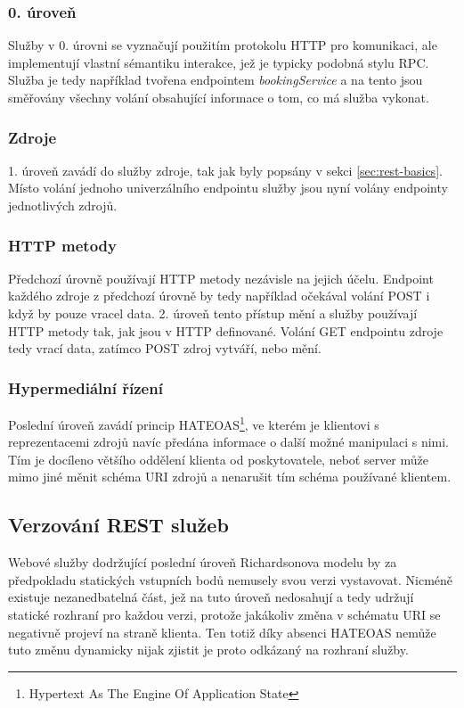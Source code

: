 \documentclass[czech,DP]{thesiskiv}
\begin{document}
\subsubsection{0. úroveň}
Služby v 0. úrovni se vyznačují použitím protokolu HTTP pro komunikaci, ale implementují vlastní sémantiku interakce, jež je typicky podobná stylu RPC. Služba je tedy například tvořena endpointem \textit{bookingService} a na tento jsou směřovány všechny volání obsahující informace o tom, co má služba vykonat. 

\subsubsection{Zdroje}
1. úroveň zavádí do služby zdroje, tak jak byly popsány v sekci \ref{sec:rest-basics}. Místo volání jednoho univerzálního endpointu služby jsou nyní volány endpointy jednotlivých zdrojů.

\subsubsection{HTTP metody}
Předchozí úrovně používají HTTP metody nezávisle na jejich účelu. Endpoint každého zdroje z předchozí úrovně by tedy například očekával volání POST i když by pouze vracel data. 2. úroveň tento přístup mění a služby používají HTTP metody tak, jak jsou v HTTP definované. Volání GET endpointu zdroje tedy vrací data, zatímco POST zdroj vytváří, nebo mění. 

\subsubsection{Hypermediální řízení}
Poslední úroveň zavádí princip HATEOAS\footnote{Hypertext As The Engine Of Application State}, ve kterém je klientovi s reprezentacemi zdrojů navíc předána informace o další možné manipulaci s nimi. Tím je docíleno většího oddělení klienta od poskytovatele, neboť server může mimo jiné měnit schéma URI zdrojů a nenarušit tím schéma používané klientem.

\subsection{Verzování REST služeb}

Webové služby dodržující poslední úroveň Richardsonova modelu by za předpokladu statických vstupních bodů nemusely svou verzi vystavovat. Nicméně existuje nezanedbatelná část, jež na tuto úroveň nedosahují a tedy udržují statické rozhraní pro každou verzi, protože jakákoliv změna v schématu URI se negativně projeví na straně klienta. Ten totiž díky absenci HATEOAS nemůže tuto změnu dynamicky nijak zjistit je proto odkázaný na rozhraní služby. 
\end{document}
